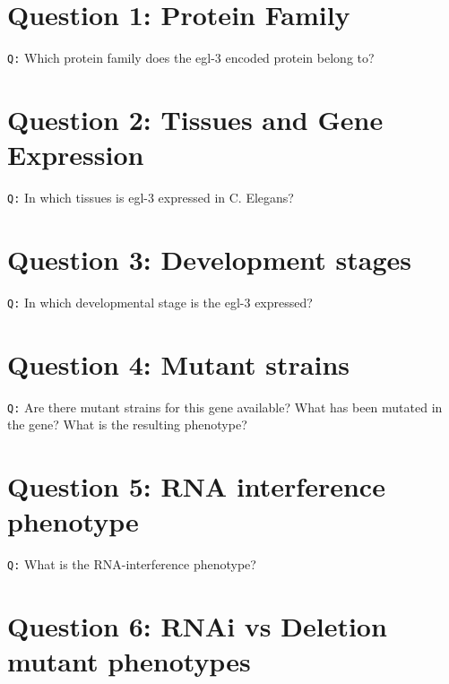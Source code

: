 \documentclass[11pt, a4paper,titlepage]{article}
\begin{document}

\setcounter{tocdepth}{3}

\tableofcontents
\newpage

\section*{Question 1: Protein Family}

\texttt{Q:} Which protein family does the egl-3 encoded protein belong to?


\section*{Question 2: Tissues and Gene Expression}

\texttt{Q:} In which tissues is egl-3 expressed in C. Elegans?


\section*{Question 3: Development stages}

\texttt{Q:} In which developmental stage is the egl-3 expressed?


\section*{Question 4: Mutant strains}

\texttt{Q:} Are there mutant strains for this gene available? What has
been mutated in the gene? What is the resulting phenotype?


\section*{Question 5: RNA interference phenotype}

\texttt{Q:} What is the RNA-interference phenotype?


\section*{Question 6: RNAi vs Deletion mutant phenotypes}
\end{document}
